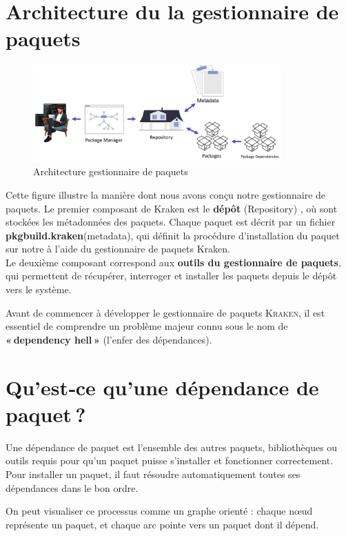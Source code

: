 \section{ Architecture du  la gestionnaire de paquets }


 


\begin{figure}[H]
  \centering
  \includegraphics[width=0.85\textwidth]{images_pfe/packagemanager.png}
  \caption{ Architecture gestionnaire de paquets }
  \label{fig:packagemanager}
\end{figure}


 Cette figure illustre la manière dont nous avons conçu notre gestionnaire de paquets. 
 Le premier composant de Kraken est le \textbf{dépôt} (Repository) , où sont stockées les métadonnées des paquets. Chaque paquet est décrit par un fichier \textbf{pkgbuild.kraken}(metadata), qui définit la procédure d'installation du paquet sur notre  à l'aide du gestionnaire de paquets Kraken. \\
 Le deuxième composant correspond aux \textbf{outils du gestionnaire de paquets}, qui permettent de récupérer, interroger et installer les paquets depuis le dépôt vers le système. 

Avant de commencer à développer le gestionnaire de paquets \textsc{Kraken}, il est essentiel de comprendre un problème majeur connu sous le nom de \textbf{« dependency hell »} (l’enfer des dépendances).

\section{Qu’est‑ce qu’une dépendance de paquet ?}
\label{subsec:dependency}

Une dépendance de paquet est l’ensemble des autres paquets, bibliothèques ou outils requis pour qu’un paquet puisse s’installer et fonctionner correctement. Pour installer un paquet, il faut résoudre automatiquement toutes ses dépendances dans le bon ordre. 

On peut visualiser ce processus comme un graphe orienté : chaque nœud représente un paquet, et chaque arc pointe vers un paquet dont il dépend.  

